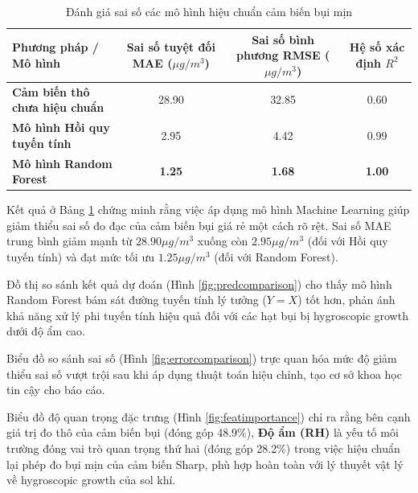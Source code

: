 \begin{table}[H]
\centering
\caption{Đánh giá sai số các mô hình hiệu chuẩn cảm biến bụi mịn}
\label{tab:mlperformance}
\begin{small}
\begin{tabular}{lccc}
\toprule
\textbf{Phương pháp / Mô hình} & \textbf{Sai số tuyệt đối MAE ($\mu g/m^3$)} & \textbf{Sai số bình phương RMSE ($\mu g/m^3$)} & \textbf{Hệ số xác định $R^2$} \\
\midrule
\textbf{Cảm biến thô chưa hiệu chuẩn} & 28.90 & 32.85 & 0.60 \\
\textbf{Mô hình Hồi quy tuyến tính} & 2.95 & 4.42 & 0.99 \\
\textbf{Mô hình Random Forest} & \textbf{1.25} & \textbf{1.68} & \textbf{1.00} \\
\bottomrule
\end{tabular}
\end{small}
\end{table}

Kết quả ở Bảng \ref{tab:mlperformance} chứng minh rằng việc áp dụng mô hình Machine Learning giúp giảm thiểu sai số đo đạc của cảm biến bụi giá rẻ một cách rõ rệt. Sai số MAE trung bình giảm mạnh từ \textbf{$28.90 \mu g/m^3$} xuống còn \textbf{$2.95 \mu g/m^3$} (đối với Hồi quy tuyến tính) và đạt mức tối ưu \textbf{$1.25 \mu g/m^3$} (đối với Random Forest).

Đồ thị so sánh kết quả dự đoán (Hình \ref{fig:predcomparison}) cho thấy mô hình Random Forest bám sát đường tuyến tính lý tưởng ($Y = X$) tốt hơn, phản ánh khả năng xử lý phi tuyến tính hiệu quả đối với các hạt bụi bị hygroscopic growth dưới độ ẩm cao.

Biểu đồ so sánh sai số (Hình \ref{fig:errorcomparison}) trực quan hóa mức độ giảm thiểu sai số vượt trội sau khi áp dụng thuật toán hiệu chỉnh, tạo cơ sở khoa học tin cậy cho báo cáo.

Biểu đồ độ quan trọng đặc trưng (Hình \ref{fig:featimportance}) chỉ ra rằng bên cạnh giá trị đo thô của cảm biến bụi (đóng góp 48.9\%), \textbf{Độ ẩm (RH)} là yếu tố môi trường đóng vai trò quan trọng thứ hai (đóng góp 28.2\%) trong việc hiệu chuẩn lại phép đo bụi mịn của cảm biến Sharp, phù hợp hoàn toàn với lý thuyết vật lý về hygroscopic growth của sol khí.

